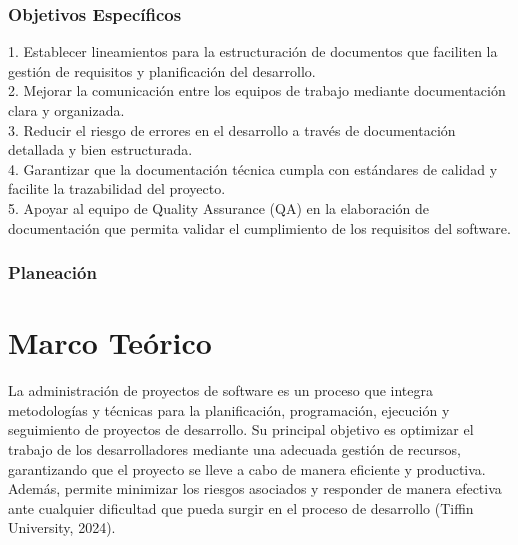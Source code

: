 \documentclass[12pt,letterpaper,spanish, xcolor=table]{report}
\numberwithin{figure}{subsection}
\begin{document}
\subsection{Objetivos Específicos}

	1. Establecer lineamientos para la estructuración de documentos que faciliten la gestión de requisitos y planificación del desarrollo.\\
	
	2. Mejorar la comunicación entre los equipos de trabajo mediante documentación clara y organizada.\\
	
	3. Reducir el riesgo de errores en el desarrollo a través de documentación detallada y bien estructurada.\\
	
	4. Garantizar que la documentación técnica cumpla con estándares de calidad y facilite la trazabilidad del proyecto.\\
	
	5. Apoyar al equipo de Quality Assurance (QA) en la elaboración de documentación que permita validar el cumplimiento de los requisitos del software.\\

	
	
\subsection{Planeación}



	
\chapter{Marco Teórico}
\newpage

La administración de proyectos de software es un proceso que integra metodologías y técnicas para la planificación, programación, ejecución y seguimiento de proyectos de desarrollo. Su principal objetivo es optimizar el trabajo de los desarrolladores mediante una adecuada gestión de recursos, garantizando que el proyecto se lleve a cabo de manera eficiente y productiva. Además, permite minimizar los riesgos asociados y responder de manera efectiva ante cualquier dificultad que pueda surgir en el proceso de desarrollo (Tiffin University, 2024). \\
\end{document}
